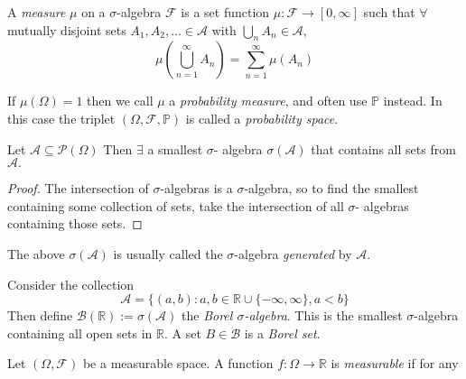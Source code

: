 \begin{definition}
    A \emph{measure} $\mu$ on a $\sigma$-algebra $\mathcal{F}$ is a set function
    $\mu:\mathcal{F}\rightarrow[0,\infty]$ such that $\forall$ mutually disjoint
    sets $A_1,A_2,...\in\mathcal{A}$ with $\bigcup_nA_n\in\mathcal{A},$
    \begin{equation}
        \mu\left(\bigcup_{n=1}^{\infty}A_n\right)=\sum_{n=1}^{\infty}\mu(A_n)
    \end{equation}
\end{definition}

\begin{remark}
    If $\mu(\Omega)=1$ then we call $\mu$ a \emph{probability measure}, and often
    use $\mathbb{P}$ instead. In this case the triplet $(\Omega,\mathcal{F},\mathbb{P})$
    is called a \emph{probability space}.
\end{remark}

\begin{lemma}
    Let $\mathcal{A}\subseteq\mathcal{P}(\Omega)$ Then $\exists$ a smallest $\sigma$-
    algebra $\sigma(\mathcal{A})$ that contains all sets from $\mathcal{A}.$
\end{lemma}
\begin{proof}
    The intersection of $\sigma$-algebras is a $\sigma$-algebra, so to find the 
    smallest containing some collection of sets, take the intersection of all $\sigma$-
    algebras containing those sets.
\end{proof}

\begin{remark}
    The above $\sigma(\mathcal{A})$ is usually called the $\sigma$-algebra
    \emph{generated} by $\mathcal{A}$.
\end{remark}

\begin{definition}
    Consider the collection 
    \begin{equation*}
        \mathcal{A}=\{(a,b):a,b\in\mathbb{R}\cup\{-\infty,\infty\},a<b\}
    \end{equation*}
    Then define $\mathcal{B}(\mathbb{R}):=\sigma(\mathcal{A})$ the \emph{Borel 
    $\sigma$-algebra}. This is the smallest $\sigma$-algebra containing all open
    sets in $\mathbb{R}$. A set $B\in\mathcal{B}$ is a \emph{Borel set}.
\end{definition}

\begin{definition}
    Let $(\Omega,\mathcal{F})$ be a measurable space. A function $f:\Omega\rightarrow\mathbb{R}$
    is \emph{measurable} if for any 
\end{definition}

